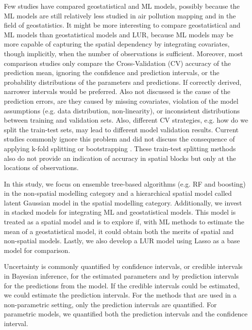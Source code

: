 \documentclass{article}
\begin{document}
Few studies have compared geostatistical and ML models, possibly because the ML models are still relatively less studied in air pollution mapping and in the field of geostatistics. It might be more interesting to compare geostatistical and ML  models  than geostatistical models and LUR, because ML models may be more capable of capturing the spatial dependency by integrating covariates, though implicitly, when the number of observations is sufficient. Moreover, most comparison studies only compare the Cross-Validation (CV) accuracy of the prediction mean, ignoring the confidence and prediction intervals, or the probability distributions of the parameters and predictions. If correctly derived, narrower intervals would be preferred. Also not discussed is the cause of the prediction errors, are they caused by missing covariates, violation of the model assumptions (e.g. data distribution, non-linearity), or inconsistent distributions between training and validation sets. Also, different CV strategies, e.g. how do we split the train-test sets, may lead to different model validation results. Current studies commonly ignore this problem and did not discuss the consequence of applying k-fold splitting \citep{kerckhoffs2019performance,larkin2017global,REN2020105827} or bootstrapping \citep{luglobal}. These train-test splitting methods also do not provide an indication of accuracy in spatial blocks but only at the locations of observations.
 

In this study, we focus on ensemble tree-based algorithms (e.g. RF and boosting) in the non-spatial modelling category and a hierarchical spatial model \citep{lindgren2015bayesian, blangiardo2015spatial,moraga2019} called latent Gaussian model in the spatial modelling category. Additionally, we invest in stacked models for integrating ML and  geostatistical  models. This model is treated as a spatial model and is to explore if, with ML methods to estimate the mean of a geostatistical model, it could obtain both the merits of spatial and non-spatial models. Lastly, we also develop a LUR model using Lasso as a base model for comparison.  

Uncertainty is commonly quantified by confidence intervals, or credible intervals in Bayesian inference, for the estimated parameters and by prediction intervals for the predictions from the model. If the credible intervals could be estimated, we could estimate the prediction intervals. For the methods that are used in a non-parametric setting, only the prediction intervals are quantified. For parametric models, we quantified both the prediction intervals and the confidence interval.  
\end{document}
